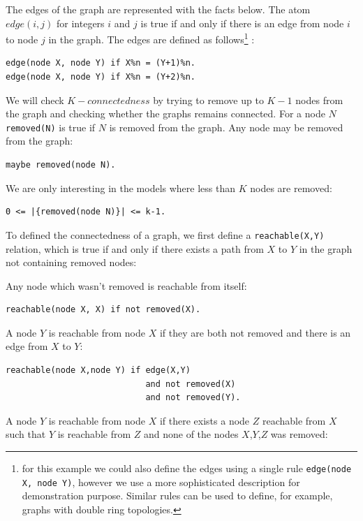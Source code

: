 \documentclass[a4paper,10pt]{article}
\begin{document}
\medskip\noindent
The edges of the graph are represented with the facts below. The atom $edge(i,j)$ for integers $i$ and $j$ is true if and only if there is an edge from node $i$ to node $j$ in the graph. The edges are defined as follows\footnote{for this example we could also define the edges using a single rule \texttt{edge(node X, node Y)}, however we use a more sophisticated description for demonstration purpose. Similar rules can be used to define, for example, graphs with double ring topologies.}  :

\begin{verbatim}
edge(node X, node Y) if X%n = (Y+1)%n.
edge(node X, node Y) if X%n = (Y+2)%n.
\end{verbatim}

\medskip\noindent
We will check $K-connectedness$ by trying to remove up to $K-1$ nodes from the graph and checking whether the graphs remains connected.
For a node $N$ \texttt{removed(N)} is true if $N$ is removed from the graph. Any node may be removed from the graph:

\begin{verbatim}
maybe removed(node N).
\end{verbatim}   

\medskip\noindent
We are only interesting in the models where less than $K$ nodes are removed:

\begin{verbatim}
0 <= |{removed(node N)}| <= k-1.
\end{verbatim}

\medskip\noindent
To defined the connectedness of a graph, we first define a \texttt{reachable(X,Y)} relation, which is true if and only if there exists a path from $X$ to $Y$ in the graph not containing removed nodes:

\medskip\noindent
Any node which wasn't removed is reachable from itself:
\begin{verbatim}
reachable(node X, X) if not removed(X).
\end{verbatim}

\medskip\noindent
A node $Y$ is reachable from node $X$ if they are both not removed and there is an edge from $X$ to $Y$:
\begin{verbatim}
reachable(node X,node Y) if edge(X,Y) 
                            and not removed(X) 
                            and not removed(Y). 
\end{verbatim}

\medskip\noindent
A node $Y$ is reachable from node $X$ if there exists a node $Z$ reachable from $X$ such that $Y$ is reachable from $Z$ and none of the nodes $X$,$Y$,$Z$ was removed:
\end{document}
